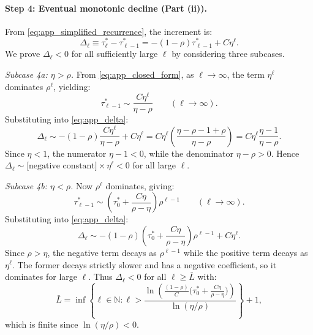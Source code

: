 \paragraph{Step 4: Eventual monotonic decline (Part (ii)).}
From \eqref{eq:app_simplified_recurrence}, the increment is:
\begin{equation}\label{eq:app_delta}
\Delta_{\ell} \equiv \tau^{*}_{\ell} - \tau^{*}_{\ell-1} = -(1-\rho)\tau^{*}_{\ell-1} + C\eta^{\ell}.
\end{equation}
We prove $\Delta_{\ell} < 0$ for all sufficiently large $\ell$ by considering three subcases.

\textit{Subcase 4a: $\eta > \rho$.} From \eqref{eq:app_closed_form}, as $\ell \to \infty$, the term $\eta^{\ell}$ dominates $\rho^{\ell}$, yielding:
\begin{equation}
\tau^{*}_{\ell-1} \sim \frac{C\eta^{\ell}}{\eta - \rho} \qquad (\ell \to \infty).
\end{equation}
Substituting into \eqref{eq:app_delta}:
\begin{equation}
\Delta_{\ell} \sim -(1-\rho)\frac{C\eta^{\ell}}{\eta-\rho} + C\eta^{\ell}
= C\eta^{\ell}\left(\frac{\eta - \rho - 1 + \rho}{\eta - \rho}\right)
= C\eta^{\ell}\frac{\eta - 1}{\eta - \rho}.
\end{equation}
Since $\eta < 1$, the numerator $\eta - 1 < 0$, while the denominator $\eta - \rho > 0$. Hence $\Delta_{\ell} \sim \text{[negative constant]} \times \eta^{\ell} < 0$ for all large $\ell$.

\textit{Subcase 4b: $\eta < \rho$.} Now $\rho^{\ell}$ dominates, giving:
\begin{equation}
\tau^{*}_{\ell-1} \sim \left(\tau^{*}_{0} + \frac{C\eta}{\rho - \eta}\right)\rho^{\ell-1} \qquad (\ell \to \infty).
\end{equation}
Substituting into \eqref{eq:app_delta}:
\begin{equation}
\Delta_{\ell} \sim -(1-\rho)\left(\tau^{*}_{0} + \frac{C\eta}{\rho-\eta}\right)\rho^{\ell-1} + C\eta^{\ell}.
\end{equation}
Since $\rho > \eta$, the negative term decays as $\rho^{\ell-1}$ while the positive term decays as $\eta^{\ell}$. The former decays strictly slower and has a negative coefficient, so it dominates for large $\ell$. Thus $\Delta_{\ell} < 0$ for all $\ell \geq \bar{L}$ with:
\begin{equation}
\bar{L} = \inf\left\{\ell \in \mathbb{N} : \ell > \frac{\ln\!\left(\frac{(1-\rho)}{C}\bigl(\tau^{*}_{0} + \frac{C\eta}{\rho-\eta}\bigr)\right)}{\ln(\eta/\rho)}\right\} + 1,
\end{equation}
which is finite since $\ln(\eta/\rho) < 0$.


